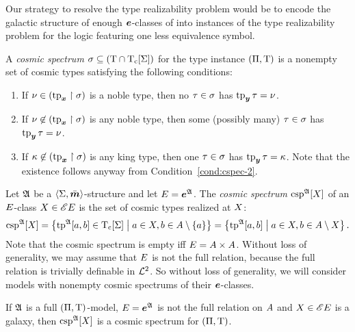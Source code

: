 Our strategy to resolve the type realizability problem would be to encode the
galactic structure of enough $\bm{e}$-classes of into instances of the type
realizability problem for the logic featuring one less equivalence symbol.
\begin{definition}
A \emph{cosmic spectrum} $\sigma \subseteq (\mathrm{T} \cap \mathrm{T}_{\mathrm{c}}[\mathrm{\Sigma}])$ for the
type instance $(\Pi,\mathrm{T})$ is a nonempty set of cosmic types satisfying
the following conditions:
\begin{enumerate}
  \item\label{cond:cspec-1} If $\nu \in (\operatorname{tp}_{\bm{x}}\restriction\sigma)$ is a noble
  type, then no $\tau \in \sigma$ has $\operatorname{tp}_{\bm{y}}\tau = \nu$.
  \item\label{cond:cspec-2} If $\nu \not\in (\operatorname{tp}_{\bm{x}}\restriction\sigma)$ is any
  noble type, then some (possibly many) $\tau \in \sigma$ has $\operatorname{tp}_{\bm{y}}\tau =
  \nu$.
  \item\label{cond:cspec-3} If $\kappa \not\in (\operatorname{tp}_{\bm{x}}\restriction\sigma)$ is any
  king type, then one $\tau \in \sigma$ has $\operatorname{tp}_{\bm{y}}\tau = \kappa$. Note that the existence follows
  anyway from Condition~\ref{cond:cspec-2}. 
\end{enumerate}
\end{definition}
\begin{definition}
Let $\mathfrak{A}$ be a $\left\langle \mathrm{\Sigma},\bar{\bm{m}} \right\rangle$-structure and let $E = \bm{e}^{\mathfrak{A}}$.
The \emph{cosmic spectrum} $\operatorname{csp}^{\mathfrak{A}}[X]$ of an $E$-class
$X \in {\mathscr{E}E}$ is the set of cosmic types realized at $X$:
\[
  \operatorname{csp}^{\mathfrak{A}}[X] = \left\{\operatorname{tp}^{\mathfrak{A}}[a,b] \in \mathrm{T}_{\mathrm{c}}[\mathrm{\Sigma}]\mathrel{}\middle|\mathrel{}a\in X, b 
  \in A\setminus\left\{a\right\}\right\} = \left\{\operatorname{tp}^{\mathfrak{A}}[a,b]\mathrel{}\middle|\mathrel{}a \in X, b \in
  A \setminus X\right\}.
\]
Note that the cosmic spectrum is empty iff $E = A\times A$.
Without loss of generality, we may assume that $E$ is not the full relation,
because the full relation is trivially definable in $\mathcal{L}^{2}$. So without loss of
generality, we will consider models with nonempty cosmic spectrums of their
$\bm{e}$-classes.
\end{definition}
\begin{remark}
If $\mathfrak{A}$ is a full $(\Pi,\mathrm{T})$-model, $E = \bm{e}^{\mathfrak{A}}$ is not the
full relation on $A$ and $X \in {\mathscr{E}E}$ is a galaxy, then
$\operatorname{csp}^{\mathfrak{A}}[X]$ is a cosmic spectrum for $(\Pi,\mathrm{T})$.
\end{remark}
